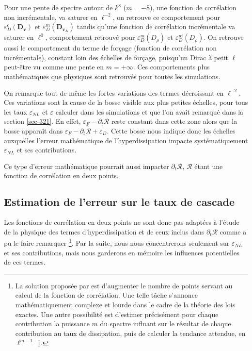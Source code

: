 Pour une pente de spectre autour de $k^8$ ($m=-8$), une fonction de corrélation non incrémentale, va saturer en $\ell^{-2}$, on retrouve ce comportement pour $ \varepsilon^{c}_{D}(\boldsymbol{D_{v}}) $ et  $\varepsilon^{m}_{D}(\boldsymbol{D_{v_A}}) $ tandis qu'une fonction de corrélation incrémentale va saturer en $\ell^0$, comportement retrouvé pour  $ \varepsilon^{m}_{D}(D_{\rho}) $ et  $\varepsilon^{ui}_{D}(D_{\rho})$. On retrouve aussi le comportement du terme de forçage (fonction de corrélation non incrémentale), constant loin des échelles de forçage, puisqu'un Dirac à petit $\ell$ peut-être vu comme une pente en $m = +\infty$. Ces comportements plus mathématiques que physiques sont retrouvés pour toutes les simulations. 

 On remarque tout de même les fortes variations des termes décroissant en $\ell^{-2}$. Ces variations sont la cause de la bosse visible aux plus petites échelles, pour tous les taux $\varepsilon_{NL}$ et $\varepsilon$ calculer dans les simulations et que l'on avait remarqué dans la section \ref{sec-321}. En effet, $\varepsilon_F - \partial_t \mathcal{R} $ reste constant dans cette zone alors que la bosse apparaît dans $\varepsilon_F - \partial_t \mathcal{R} + \varepsilon_D $. Cette bosse nous indique donc les échelles auxquelles l'erreur mathématique de l'hyperdissipation impacte systématiquement $\varepsilon_{NL}$ et ses contributions.  

 Ce type d'erreur mathématique pourrait aussi impacter $\partial_t \mathcal{R}$, $\mathcal{R}$ étant une fonction de corrélation en deux points.
 
 \subsection{Estimation de l'erreur sur le taux de cascade  } 

Les fonctions de corrélation en deux points ne sont donc pas adaptées à l'étude de la physique des termes d'hyperdissipation et de ceux inclus dans $\partial_t \mathcal{R}$ comme a pu le faire remarquer \cite{cho_simulations_2009}\footnote{ La solution proposée par \cite{cho_simulations_2009} est d'augmenter le nombre de points servant au calcul de la fonction de corrélation. Une telle tâche s'annonce mathématiquement complexe et lourde dans le cadre de la théorie des lois exactes. Une autre possibilité est d'estimer précisément pour chaque contribution la puissance $m$ du spectre influant sur le résultat de chaque contribution au taux de dissipation, puis de calculer la tendance attendue, en $\ell^{m-1}$ [\cite{ferrand_multi-scale_2021}].}. Par la suite, nous nous concentrerons seulement sur $\varepsilon_{NL}$ et ses contributions, mais nous garderons en mémoire les influences potentielles de ces termes.

